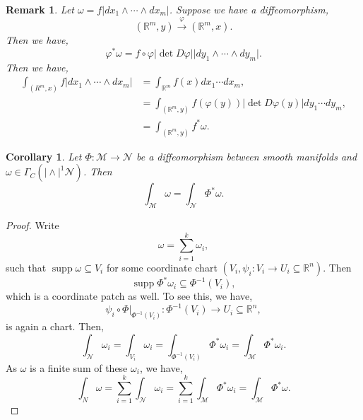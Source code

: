 \documentclass[10pt]{article}
\newtheorem{remark}{Remark}[section]
\newtheorem{corollary}{Corollary} [section]
\DeclareMathOperator{\supp}{supp}
\newcommand{\R}[0]{\mathbb{R}}
\newcommand{\M}[0]{\mathcal{M}}
\newcommand{\maniN}[0]{\mathcal{N}}
\begin{document}

\begin{remark}
  Let $\omega = f\vert dx_1\wedge\cdots\wedge dx_m\vert$. Suppose we have a diffeomorphism,
  \begin{equation*}
    (\R^m,y)\stackrel{\varphi}{\to}(\R^m,x).
  \end{equation*}
  Then we have,
  \begin{equation*}
    \varphi^*\omega = f\circ\varphi\vert\det D\varphi\vert\vert dy_1\wedge\cdots\wedge dy_m\vert.
  \end{equation*}
  Then we have,
  \begin{align*}
    \int_{(R^m,x)}f\vert dx_1\wedge\cdots\wedge dx_m\vert & = \int_{\R^m}f(x)dx_1\cdots dx_m,\\
    & = \int_{(\R^m,y)}f(\varphi(y))\vert \det D\varphi(y)\vert dy_1\cdots dy_m,\\
    & = \int_{(\R^m,y)}f^*\omega.
  \end{align*}
\end{remark}

\begin{corollary}
  Let $\Phi:\M\to\maniN$ be a diffeomorphism between smooth manifolds and $\omega\in\Gamma_C(\vert\wedge\vert^1\maniN)$. Then 
  \begin{equation*}
    \int_\M\omega = \int_\maniN\Phi^*\omega.
  \end{equation*}
\end{corollary}

\begin{proof}
  Write 
  \begin{equation*}
    \omega = \sum_{i=1}^k \omega_i,
  \end{equation*}
  such that $\supp\omega\subseteq V_i$ for some coordinate chart $(V_i,\psi_i:V_i\to U_i\subseteq\R^n)$. Then 
  \begin{equation*}
    \supp\Phi^*\omega_i\subseteq\Phi^{-1}(V_i),
  \end{equation*} 
  which is a coordinate patch as well. To see this, we have,
  \begin{equation*}
    \psi_i\circ\Phi|_{\Phi^{-1}(V_i)}:\Phi^{-1}(V_i)\to U_i\subseteq\R^n,
  \end{equation*}
  is again a chart. Then,
  \begin{equation*}
    \int_{\maniN}\omega_i = \int_{V_i}\omega_i = \int_{\Phi^{-1}(V_i)}\Phi^*\omega_i = \int_\M\Phi^*\omega_i.
  \end{equation*}
  As $\omega$ is a finite sum of these $\omega_i$, we have,
  \begin{equation*}
    \int_N\omega = \sum_{i=1}^k \int_\maniN\omega_i = \sum_{i=1}^k \int_\M\Phi^*\omega_i = \int_\M\Phi^*\omega.
  \end{equation*}
\end{proof}
\end{document}
